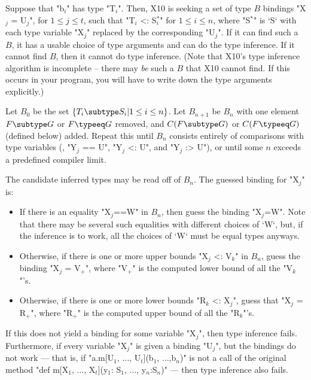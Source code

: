 {Suppose that \xcdmath"b$_i$" has type \xcdmath"T$_i$".  Then, X10 is seeking a
set of type {$B$} bindings \xcdmath"X$_j$ = U$_j$", for $1 \le j \le t$, such that 
\xcdmath"T$_i$ <: S$^*_i$" for {$1 \le i \le n$}, where \xcdmath"S$^*$" is
\xcd`S` with each type variable \xcdmath"X$_j$" replaced by the corresponding
\xcdmath"U$_j$".  If it can find such a {$B$}, it has a usable choice of type
arguments and can do the type inference.  If it cannot find {$B$}, then it
cannot do type inference.    (Note that X10's type inference algorithm is
incomplete -- there may {\em be} such a {$B$} that X10 cannot find.  If this
occurs in your program, you will have to write down the type arguments
explicitly.) 

Let $B_0$ be the set {$\{ T_i \subtype S_i | 1 \le i \le n\}$}.  Let
{$B_{n+1}$} be {$B_n$} with one element {$F \subtype G$} or 
{$F \typeeq G$} removed, and
{$C(F \subtype G)$} 
or {$C(F \typeeq G)$} (defined below) added.  Repeat this until 
{$B_n$} consists entirely of comparisons with type variables (\viz, 
\xcdmath"Y$_j$ == U", 
\xcdmath"Y$_j$ <: U", and
\xcdmath"Y$_j$ :> U"), 
or until some {$n$} exceeds a predefined compiler limit. 

The candidate inferred types may be read off of {$B_n$}.  The guessed binding
for \xcdmath"X$_j$" is: 
\begin{itemize}
\item If there is an equality \xcdmath"X$_j$==W" in {$B_n$}, then guess the
      binding \xcdmath"X$_j$=W".  Note that there may be several such
      equalities with different choices of \xcd`W`, but, if the inference is
      to work, all the choices of \xcd`W` must be equal types anyways.
\item Otherwise, if there is one or more upper bounds 
\xcdmath"X$_j$ <: V$_k$" in {$B_n$}, guess the binding 
\xcdmath"X$_j$ = V$_+$", where 
\xcdmath"V$_+$" is the computed lower bound of all the \xcdmath"V$_k$"'s.
\item Otherwise, if there is one or more lower bounds 
\xcdmath"R$_k$ <: X$_j$", guess that
\xcdmath"X$_j$ = R$_+$", where 
\xcdmath"R$_+$" is the computed upper bound of all the \xcdmath"R$_k$"'s.
\end{itemize}
If this does not yield a binding for some variable \xcdmath"X$_j$", then type
inference fails.  Furthermore, if every variable \xcdmath"X$_j$" is given a
binding \xcdmath"U$_j$", but the 
bindings do not work --- 
that is, if 
\xcdmath"a.m[U$_1$, $\ldots$, U$_t$](b$_1$, $\ldots$,b$_n$)"
is not a call of 
the original method 
\xcdmath"def m[X$_1$, $\ldots$, X$_t$](y$_1$: S$_1$, $\ldots$, y$_n$:S$_n$)"
--- then type inference also fails.

}
